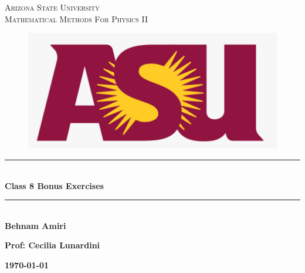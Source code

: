 \documentclass[fleqn]{article}
\begin{document}
  \begin{titlepage}

    \newcommand{\HRule}{\rule{\linewidth}{0.5mm}} %

    \center %



    \textsc{\LARGE Arizona State University}\\[1.5cm] %

    \textsc{\LARGE Mathematical Methods For Physics II }\\[1.5cm] %


    \begin{figure}
      \includegraphics[width=\linewidth]{asu.png}
    \end{figure}


    \HRule \\[0.4cm]
    { \huge \bfseries Class 8 Bonus Exercises}\\[0.4cm] 
    \HRule \\[1.5cm]

    \textbf{Behnam Amiri}

    \bigbreak

    \textbf{Prof: Cecilia Lunardini}

    \bigbreak


    \textbf{{\large \today}\\[2cm]}

    \vfill %

  \end{titlepage}
\end{document}
